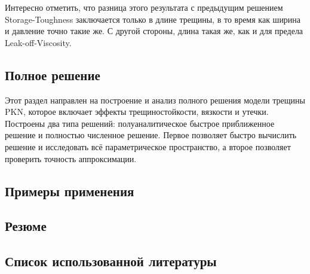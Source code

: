 \documentclass[a4paper, 12pt]{article}
\begin{document}
Интересно отметить, что разница этого результата с предыдущим решением Storage-Toughness заключается только в длине трещины, в то время как ширина и давление точно такие же.
С другой стороны, длина такая же, как и для предела Leak-off-Viscosity.

\subsection{Полное решение}

Этот раздел направлен на построение и анализ полного решения модели трещины PKN, которое включает эффекты трещиностойкости, вязкости и утечки.
Построены два типа решений: полуаналитическое быстрое приближенное решение и полностью численное решение.
Первое позволяет быстро вычислить решение и исследовать всё параметрическое пространство, а второе позволяет проверить точность аппроксимации.


\subsection{Примеры применения}


\subsection{Резюме}


\subsection{Список использованной литературы}
\end{document}
